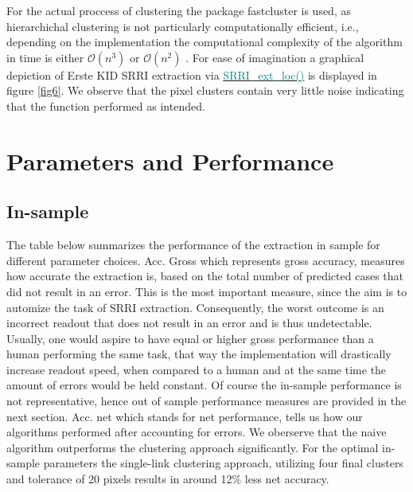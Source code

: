 \documentclass[aodsor,preprint]{imsart}
\numberwithin{equation}{section}
\theoremstyle{plain}
\begin{document}
 For the actual proccess of clustering the package fastcluster is used, as hierarchichal clustering is not particularly computationally efficient, i.e., depending on the implementation the computational complexity of the algorithm in time is either $\mathcal{O}(n^3)$ or $\mathcal{O}(n^2)$ \citep{JSSv053i09, Rok09}. For ease of imagination a graphical depiction of Erste KID SRRI extraction via \href{https://github.com/Base-R-Best-R/KID/blob/main/Code/Package/KIDs/R/SRRI_ext_loc.R}{\textcolor{teal}{SRRI\_ext\_loc()}} is displayed in figure \ref{fig6}. We observe that the pixel clusters contain very little noise indicating that the function performed as intended.


\section{Parameters and Performance} 
\subsection{In-sample}
The table below summarizes the performance of the extraction in sample for different parameter choices. Acc. Gross which represents gross accuracy, measures how accurate the extraction is, based on the total number of predicted cases that did not result in an error. This is the most important measure, since the aim is to automize the task of SRRI extraction. Consequently, the worst outcome is an incorrect readout that does not result in an error and is thus undetectable. Usually, one would aspire to have equal or higher gross performance than a human performing the same task, that way the implementation will drastically increase readout speed, when compared to a human and at the same time the amount of errors would be held constant. Of course the in-sample performance is not representative, hence out of sample performance measures are provided in the next section. Acc. net which stands for net performance, tells us how our algorithms performed after accounting for errors. We oberserve that the naive algorithm outperforms the clustering approach significantly. For the optimal in-sample parameters the single-link clustering approach, utilizing four final clusters and tolerance of 20 pixels results in around 12\% less net accuracy.
\end{document}
